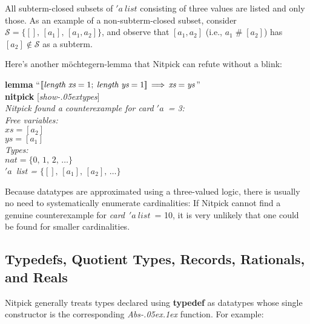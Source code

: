 \documentclass[a4paper,12pt]{article}
\def\unr{\ldots}
\renewcommand\_{\hbox{\textunderscore\kern-.05ex}}
\begin{document}
All subterm-closed subsets of $'a~\textit{list}$ consisting of three values
are listed and only those. As an example of a non-subterm-closed subset,
consider $\mathcal{S} = \{[],\, [a_1],\,\allowbreak [a_1, a_2]\}$, and observe
that $[a_1, a_2]$ (i.e., $a_1 \mathbin{\#} [a_2]$) has $[a_2] \notin
\mathcal{S}$ as a subterm.

Here's another m\"ochtegern-lemma that Nitpick can refute without a blink:

\prew
\textbf{lemma} ``$\mathopen{[\![} \textit{length}~\textit{xs} = 1;\> \textit{length}~\textit{ys} = 1
\mathclose{]\!]} \,\Longrightarrow\, \textit{xs} = \textit{ys\/}$''
\\
\textbf{nitpick} [\textit{show\_types}] \\[2\smallskipamount]
\slshape Nitpick found a counterexample for \textit{card} $'a$~= 3: \\[2\smallskipamount]
\hbox{}\qquad Free variables: \nopagebreak \\
\hbox{}\qquad\qquad $\textit{xs} = [a_2]$ \\
\hbox{}\qquad\qquad $\textit{ys} = [a_1]$ \\
\hbox{}\qquad Types: \\
\hbox{}\qquad\qquad $\textit{nat} = \{0,\, 1,\, 2,\, \unr\}$ \\
\hbox{}\qquad\qquad $'a$~\textit{list} = $\{[],\, [a_1],\, [a_2],\, \unr\}$
\postw

Because datatypes are approximated using a three-valued logic, there is usually
no need to systematically enumerate cardinalities: If Nitpick cannot find a
genuine counterexample for \textit{card}~$'a~\textit{list}$~= 10, it is very
unlikely that one could be found for smaller cardinalities.

\subsection{Typedefs, Quotient Types, Records, Rationals, and Reals}
\label{typedefs-quotient-types-records-rationals-and-reals}

Nitpick generally treats types declared using \textbf{typedef} as datatypes
whose single constructor is the corresponding \textit{Abs\_\kern.1ex} function.
For example:
\end{document}
